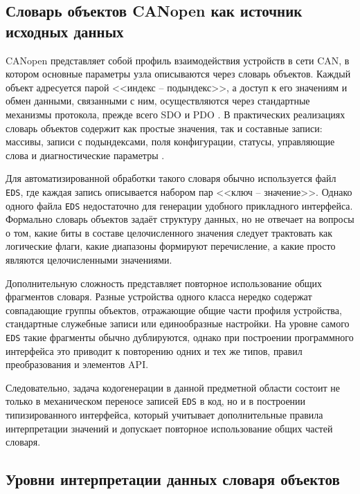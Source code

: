 \documentclass[a4paper,12pt]{article}
\begin{document}
\subsection{Словарь объектов CANopen как источник исходных данных}

CANopen представляет собой профиль взаимодействия устройств в сети CAN, в котором
основные параметры узла описываются через словарь объектов.
Каждый объект адресуется парой <<индекс -- подындекс>>, а доступ к его значениям
и обмен данными, связанными с ним, осуществляются через стандартные механизмы протокола,
прежде всего SDO и PDO
\cite{cia_301_2011,csse_canbus_intro_2025,csse_canopen_intro_2025,canopennode_od}. В практических
реализациях словарь объектов содержит как простые значения, так и составные записи:
массивы, записи с подындексами, поля конфигурации, статусы, управляющие слова и
диагностические параметры \cite{maxon_epos4_firmware}.

Для автоматизированной обработки такого словаря обычно используется файл \texttt{EDS},
где каждая запись описывается набором пар <<ключ -- значение>>. Однако одного файла
\texttt{EDS} недостаточно для генерации удобного прикладного интерфейса. Формально
словарь объектов задаёт структуру данных, но не отвечает на вопросы о том, какие биты
в составе целочисленного значения следует трактовать как логические флаги, какие
диапазоны формируют перечисление, а какие просто являются целочисленными значениями.

Дополнительную сложность представляет повторное использование общих фрагментов словаря.
Разные устройства одного класса нередко содержат совпадающие группы объектов,
отражающие общие части профиля устройства, стандартные служебные записи или
единообразные настройки. На уровне самого \texttt{EDS} такие фрагменты обычно
дублируются, однако при построении программного интерфейса это приводит к повторению
одних и тех же типов, правил преобразования и элементов API.

Следовательно, задача кодогенерации в данной предметной области состоит не только в
механическом переносе записей \texttt{EDS} в код, но и в построении типизированного
интерфейса, который учитывает дополнительные правила интерпретации значений и
допускает повторное использование общих частей словаря.

\subsection{Уровни интерпретации данных словаря объектов}
\end{document}

